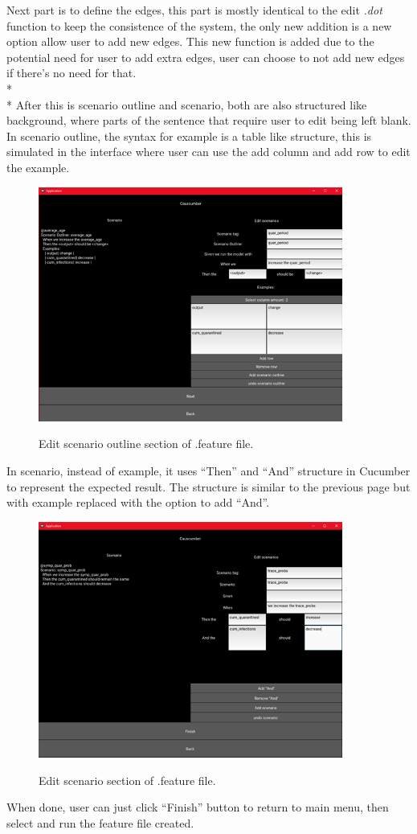 Next part is to define the edges, this part is mostly identical to the edit \textsl{.dot} function to keep the consistence of the system, the only new addition is a new option allow user to add new edges. This new function is added due to the potential need for user to add extra edges, user can choose to not add new edges if there’s no need for that.\\*\\*
After this is scenario outline and scenario, both are also structured like background, where parts of the sentence that require user to edit being left blank. In scenario outline, the syntax for example is a table like structure, this is simulated in the interface where user can use the add column and add row to edit the example. 
\begin{figure}[H]
	\centering
	\includegraphics[width=10cm]{figures/editFeature2Screen.png}\\
	\caption{Edit scenario outline section of .feature file.}
	\label{fig:figure17}
\end{figure}
In scenario, instead of example, it uses “Then” and “And” structure in Cucumber to represent the expected result. The structure is similar to the previous page but with example replaced with the option to add “And”.
\begin{figure}[H]
	\centering
	\includegraphics[width=10cm]{figures/editFeature3Screen.png}\\
	\caption{Edit scenario section of .feature file.}
	\label{fig:figure18}
\end{figure}
When done, user can just click “Finish” button to return to main menu, then select and run the feature file created.







